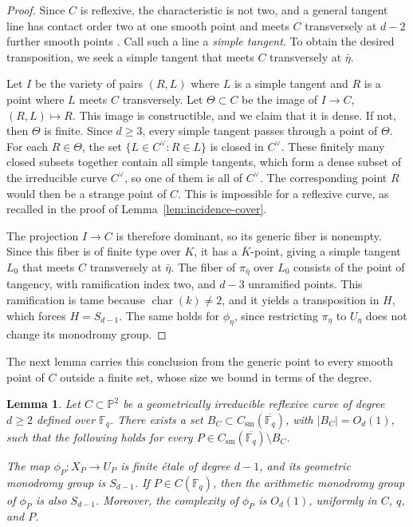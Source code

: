\documentclass[12pt,reqno]{amsart}
\newtheorem{lemma}[theorem]{Lemma}
\theoremstyle{definition}
\theoremstyle{remark}
\newcommand{\Fq}{\mathbb{F}_q}
\newcommand{\bP}{\mathbb{P}}
\begin{document}
\begin{proof}
Since $C$ is reflexive, the characteristic is not two, and a general tangent line has contact order two at one smooth point and meets $C$ transversely at $d-2$ further smooth points \cite[Section~2]{Ent21}. Call such a line a \emph{simple tangent}. To obtain the desired transposition, we seek a simple tangent
that meets $C$ transversely at $\bar\eta$.

Let $I$ be the variety of pairs $(R,L)$ where $L$ is a simple tangent and $R$ is a point where $L$ meets $C$ transversely. Let $\Theta\subset C$ be the image of $I\to C$, $(R,L)\mapsto R$. This image is constructible, and we claim that it is dense. If not, then $\Theta$ is finite. Since $d\geq3$, every simple tangent passes through a point of $\Theta$. For each $R\in\Theta$, the set $\{L\in C^\vee:R\in L\}$ is closed in $C^\vee$. These finitely many closed subsets together contain all simple tangents, which form a dense subset of the irreducible curve $C^\vee$, so one of them is all of $C^\vee$. The corresponding point $R$ would then be a strange point of $C$. This is impossible for a reflexive curve, as recalled in the proof of Lemma~\ref{lem:incidence-cover}.

The projection $I\to C$ is therefore dominant, so its generic fiber is nonempty. Since this fiber is of finite type over $K$, it has a $\overline K$-point, giving a simple tangent $L_0$ that meets $C$ transversely at $\bar\eta$. The fiber of $\pi_{\bar\eta}$ over $L_0$ consists of the point of tangency, with ramification index two, and $d-3$ unramified points. This ramification is tame because $\operatorname{char}(k)\neq2$, and it yields a transposition in $H$, which forces $H=S_{d-1}$. The same holds for $\phi_\eta$, since restricting $\pi_\eta$ to $U_\eta$ does not change its monodromy group.
\end{proof}

The next lemma carries this conclusion from the generic point to every smooth point of $C$ outside a finite set, whose size we bound in terms of the degree.

\begin{lemma}\label{lem:projection-monodromy}
Let $C\subset\bP^2$ be a geometrically irreducible reflexive curve of degree $d\geq2$ defined over $\Fq$. There exists a set $B_C\subset C_{\mathrm{sm}}(\overline{\Fq})$, with $|B_C|=O_d(1)$, such that the following holds for every
$P\in C_{\mathrm{sm}}(\overline{\Fq})\setminus B_C$.

The map $\phi_P\colon X_P\to U_P$ is finite \'etale of degree $d-1$, and its geometric monodromy group is $S_{d-1}$. If $P\in C(\Fq)$, then the arithmetic monodromy group of $\phi_P$ is also $S_{d-1}$. Moreover, the complexity of $\phi_P$ is $O_d(1)$, uniformly in $C$, $q$, and $P$.
\end{lemma}
\end{document}
